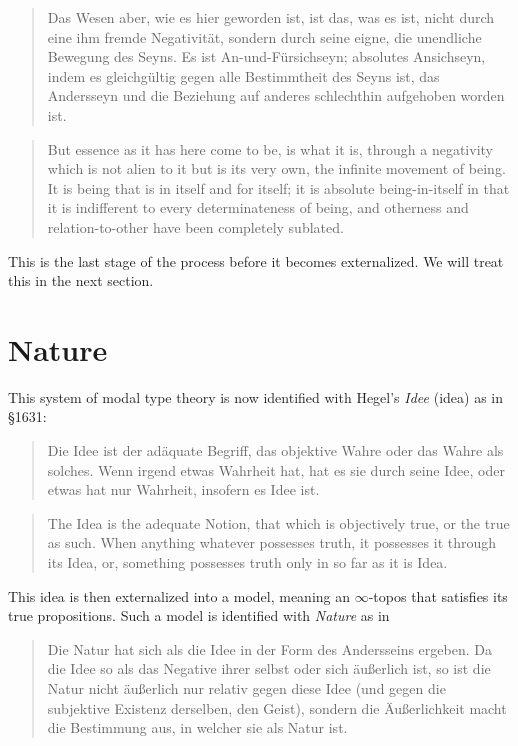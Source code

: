 \documentclass{article}
\begin{document}
\begin{quote}
    Das Wesen aber, wie es hier geworden ist, ist das, was es ist, nicht durch eine ihm fremde Negativität, sondern durch seine eigne, die unendliche Bewegung des Seyns. Es ist An-und-Fürsichseyn; absolutes Ansichseyn, indem es gleichgültig gegen alle Bestimmtheit des Seyns ist, das Andersseyn und die Beziehung auf anderes schlechthin aufgehoben worden ist.
\end{quote}

\begin{quote}
    But essence as it has here come to be, is what it is, through a negativity which is not alien to it but is its very own, the infinite movement of being. It is being that is in itself and for itself; it is absolute being-in-itself in that it is indifferent to every determinateness of being, and otherness and relation-to-other have been completely sublated.
\end{quote}

This is the last stage of the process before it becomes externalized. We will treat this in the next section.


\section{Nature}
This system of modal type theory is now identified with Hegel's \emph{Idee} (idea) as in §1631:

\begin{quote}
    Die Idee ist der adäquate Begriff, das objektive Wahre oder das Wahre als solches. Wenn irgend etwas Wahrheit hat, hat es sie durch seine Idee, oder etwas hat nur Wahrheit, insofern es Idee ist.
\end{quote}

\begin{quote}
    The Idea is the adequate Notion, that which is objectively true, or the true as such. When anything whatever possesses truth, it possesses it through its Idea, or, something possesses truth only in so far as it is Idea.
\end{quote}

This idea is then externalized into a model, meaning an $\infty$-topos that satisfies its true propositions. Such a model is identified with \emph{Nature} as in 

\begin{quote}
    Die Natur hat sich als die Idee in der Form des Andersseins ergeben. Da die Idee so als das Negative ihrer selbst oder sich äußerlich ist, so ist die Natur nicht äußerlich nur relativ gegen diese Idee (und gegen die subjektive Existenz derselben, den Geist), sondern die Äußerlichkeit macht die Bestimmung aus, in welcher sie als Natur ist.
\end{quote}
\end{document}
